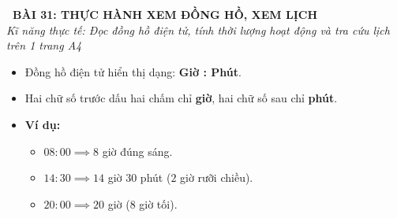 \documentclass[11pt,a4paper]{article}
\begin{document}
\begin{tcolorbox}[
  enhanced,
  colback=violet!8!white,
  colframe=violet!70!black,
  arc=3mm, boxrule=1.2pt,
  left=3mm, right=3mm, top=2mm, bottom=2mm,
  halign=center
]
  {\LARGE\bfseries\color{violet!90!black}\faBookmark\ BÀI 31: THỰC HÀNH XEM ĐỒNG HỒ, XEM LỊCH}\\[1mm]
  {\itshape\footnotesize\color{black!75} Kĩ năng thực tế: Đọc đồng hồ điện tử, tính thời lượng hoạt động và tra cứu lịch trên 1 trang A4}
\end{tcolorbox}

\vspace{-2mm}

\noindent
\begin{minipage}[t]{0.49\textwidth}\vspace{0pt}
\begin{tcolorbox}[
  enhanced,
  colback=violet!4!white,
  colframe=violet!75!black,
  arc=2mm, boxrule=0.8pt,
  left=2mm, right=2mm, top=1.8mm, bottom=1.8mm,
  title={\footnotesize\bfseries\color{white}\faKey\ 1. Đọc đồng hồ điện tử}
]
{\footnotesize
\begin{itemize}\setlength{\itemsep}{1pt}\setlength{\leftskip}{-2.5mm}
  \item Đồng hồ điện tử hiển thị dạng: \textbf{Giờ : Phút}.
  \item Hai chữ số trước dấu hai chấm chỉ \textbf{giờ}, hai chữ số sau chỉ \textbf{phút}.
  \item \textbf{Ví dụ:}
  \begin{itemize}\setlength{\itemsep}{0.5pt}\setlength{\leftskip}{-2.5mm}
    \item $08:00 \implies 8$ giờ đúng sáng.
    \item $14:30 \implies 14$ giờ $30$ phút ($2$ giờ rưỡi chiều).
    \item $20:00 \implies 20$ giờ ($8$ giờ tối).
  \end{itemize}
\end{itemize}
}
\end{tcolorbox}
\end{minipage}
\hfill
\end{document}
